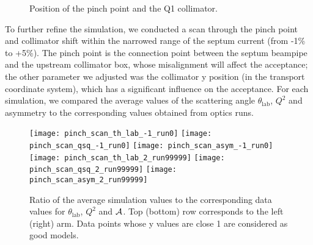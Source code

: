 \begin{figure}[H]
    \centering
    \caption{Position of the pinch point and the Q1 collimator.}
\end{figure}

To further refine the simulation, we conducted a scan through the pinch point and collimator shift within the narrowed range of the septum current (from -1\% to +5\%).
The pinch point is the connection point between the septum beampipe and the upstream collimator box, 
whose misalignment will affect the acceptance; the other parameter we adjusted was the collimator y position (in the transport coordinate system), which has a significant influence on the acceptance. For each simulation, we compared the average values of the scattering angle $\theta_{\text{lab}}$, $Q^2$ and asymmetry to the corresponding values obtained from optics runs.

\begin{figure}[H]
    \centering
    \texttt{[image: pinch\_scan\_th\_lab\_-1\_run0]}
    \texttt{[image: pinch\_scan\_qsq\_-1\_run0]}
    \texttt{[image: pinch\_scan\_asym\_-1\_run0]}
    \texttt{[image: pinch\_scan\_th\_lab\_2\_run99999]}
    \texttt{[image: pinch\_scan\_qsq\_2\_run99999]}
    \texttt{[image: pinch\_scan\_asym\_2\_run99999]}
    \caption[Ratio plot of simulation to data]{Ratio of the average simulation values to 
    the corresponding data values for $\theta_{\text{lab}}$, $Q^2$ and $\mathcal{A}$. 
    Top (bottom) row corresponds to the left (right) arm. 
    Data points whose y values are close 1 are considered as good models.
    }
    \label{fig:pinch_scan}
\end{figure}

